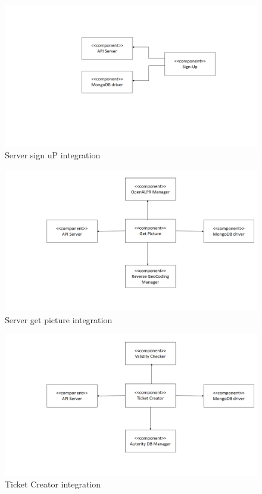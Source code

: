 \begin{figure}[H]
\centering
\includegraphics[width=\textwidth]{Images/ServerSignUPIntegration.png}
\caption{\label{fig:ServerSignUPIntegration}Server sign uP integration}
\end{figure}

\begin{figure}[H]
\centering
\includegraphics[width=\textwidth]{Images/ServerGetPicIntegration.png}
\caption{\label{fig:ServerGetPicIntegration} Server get picture integration}
\end{figure}

\begin{figure}[H]
\centering
\includegraphics[width=\textwidth]{Images/TicketCreatorIntegration.png}
\caption{\label{fig:TicketCreatorIntegration} Ticket Creator integration}
\end{figure}


